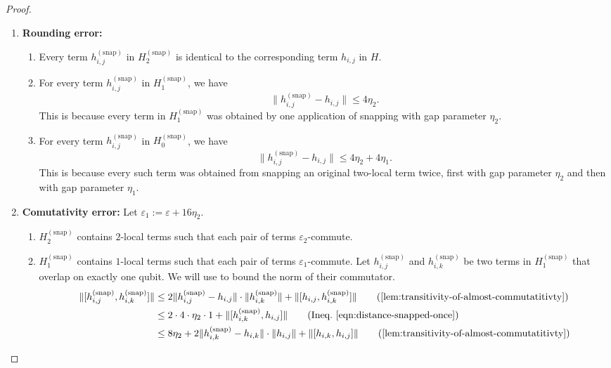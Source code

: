 \documentclass[a4paper,onecolumn,11pt]{quantumarticle}
\theoremstyle{plain}
\newcommand{\eps}{\varepsilon}
\newcommand{\snp}{{(\mathrm{snap})}}
\begin{document}
\begin{proof}
\begin{enumerate}
\begin{enumerate}
\begin{enumerate}
        \item Every term $h_{i,j}^\snp$ in $H^\snp_0$ is proportional to the identity (zero spectral gap).
    \end{enumerate}
    \item \textbf{Rounding error:}
    \begin{enumerate}
        \item Every term $h^\snp_{i,j}$ in $H^\snp_2$ is identical to the corresponding term $h_{i,j}$ in $H$.
        \item For every term $h^\snp_{i,j}$ in $H^\snp_1$, we have
        \begin{equation}\label{eqn:distance-snapped-once}
            \| h^\snp_{i,j} - h_{i,j} \| \leq 4\eta_2.
        \end{equation}
        This is because every term in $H^\snp_1$ was obtained by one application of snapping with gap parameter $\eta_2$.
        \item For every term $h^\snp_{i,j}$ in $H^\snp_0$, we have
        \[ \|h^\snp_{i,j} - h_{i,j}\| \leq 4\eta_2 + 4\eta_1. \]
        This is because every such term was obtained from snapping an original two-local term twice, first with gap parameter $\eta_2$ and then with gap parameter $\eta_1$.
    \end{enumerate}
        \item \textbf{Comutativity error:} Let $\eps_1 := \eps + 16\eta_2$.
    \begin{enumerate}
        \item $H^\snp_2$ contains $2$-local terms such that each pair of terms $\eps_2$-commute.
        \item $H^\snp_1$ contains $1$-local terms such that each pair of terms $\eps_1$-commute. Let $h^\snp_{i, j}$ and $h^\snp_{i, k}$ be two terms in $H^\snp_1$ that overlap on exactly one qubit. We will use  to bound the norm of their commutator.
\begin{align}
    \|[h^\snp_{i, j}, h^\snp_{i, k}]\| & \leq 2 \|h^\snp_{i, j} - h_{i, j}\| \cdot \|h^\snp_{i, k}\| + \|[h_{i, j}, h^\snp_{i, k}]\| \qquad \text{(\Cref{lem:transitivity-of-almost-commutatitivty})}\\
    & \leq 2 \cdot 4 \cdot  \eta_2 \cdot 1 + \|[h^\snp_{i, k}, h_{i, j}]\| \qquad \text{(Ineq.~\ref{eqn:distance-snapped-once})}\\
    & \leq 8 \eta_2  +  2 \|h^\snp_{i, k} - h_{i, k}\| \cdot \|h_{i, j}\| + \|[h_{i, k}, h_{i,j}]\|\qquad \text{(\Cref{lem:transitivity-of-almost-commutatitivty})}\\

\end{align}
\end{enumerate}
\end{enumerate}
\end{enumerate}
\end{proof}
\end{document}
